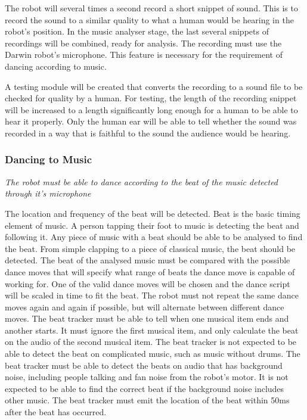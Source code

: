 \documentclass[english,12pt]{scrartcl}
\newcommand{\requirement}[1]{\textit{#1}}
\begin{document}
				The robot will several times a second record a short snippet of sound.
				This is to record the sound to a similar quality to what a human would be hearing in the robot’s position.
				In the music analyser stage, the last several snippets of recordings will be combined, ready for analysis.
				The recording must use the Darwin robot’s microphone. This feature is necessary for the requirement of dancing according to music.

				A testing module will be created that converts the recording to a sound file to be checked for quality by a human.
				For testing, the length of the recording snippet will be increased to a length significantly long enough for a human to be able to hear it properly.
				Only the human ear will be able to tell whether the sound was recorded in a way that is faithful to the sound the audience would be hearing.
				
			\subsubsection{Dancing to Music}
				\requirement{The robot must be able to dance according to the beat of the music detected through it's microphone}

				The location and frequency of the beat will be detected. Beat is the basic timing element of music.
				A person tapping their foot to music is detecting the beat and following it.
				Any piece of music with a beat should be able to be analysed to find the beat.
				From simple clapping to a piece of classical music, the beat should be detected.
				The beat of the analysed music must be compared with the possible dance moves that will specify what range of beats the dance move is capable of working for.
				One of the valid dance moves will be chosen and the dance script will be scaled in time to fit the beat.
				The robot must not repeat the same dance moves again and again if possible, but will alternate between different dance moves.
				The beat tracker must be able to tell when one musical item ends and another starts. It must ignore the first musical item, and only calculate the beat on the audio of the second musical item.
				The beat tracker is not expected to be able to detect the beat on complicated music, such as music without drums.
				The beat tracker must be able to detect the beats on audio that has background noise, including people talking and fan noise from the robot’s motor.
				It is not expected to be able to find the correct beat if the background noise includes other music. The beat tracker must emit the location of the beat within 50ms after the beat has occurred.
				
\end{document}
